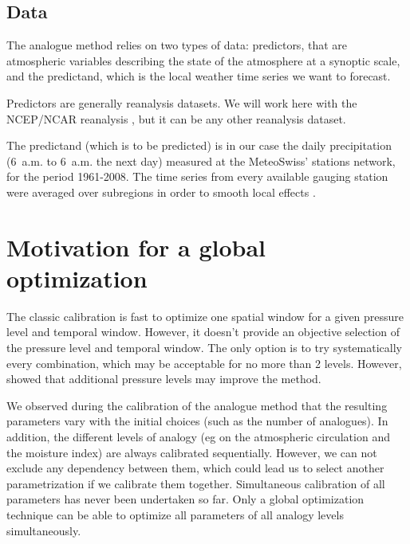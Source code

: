 \documentclass{ametsoc}
\begin{document}
\subsection{Data}
\label{section_data}

The analogue method relies on two types of data: predictors, that are atmospheric variables describing the state of the atmosphere at a synoptic scale, and the predictand, which is the local weather time series we want to forecast.

Predictors are generally reanalysis datasets. We will work here with the NCEP/NCAR reanalysis \citep[6-hourly, 17 pressure levels at a resolution of 2.5\degree, see][]{Kalnay1996}, but it can be any other reanalysis dataset.

The predictand (which is to be predicted) is in our case the daily precipitation (6~a.m. to 6~a.m. the next day) measured at the MeteoSwiss' stations network, for the period 1961-2008. The time series from every available gauging station were averaged over subregions in order to smooth local effects \citep{Obled2002, Marty2012}.



\section{Motivation for a global optimization}

The classic calibration is fast to optimize one spatial window for a given pressure level and temporal window. However, it doesn't provide an objective selection of the pressure level and temporal window. The only option is to try systematically every combination, which may be acceptable for no more than 2 levels. However, \citet{Horton2012a} showed that additional pressure levels may improve the method.

We observed during the calibration of the analogue method that the resulting parameters vary with the initial choices (such as the number of analogues). In addition, the different levels of analogy (eg on the atmospheric circulation and the moisture index) are always calibrated sequentially. However, we can not exclude any dependency between them, which could lead us to select another parametrization if we calibrate them together. Simultaneous calibration of all parameters has never been undertaken so far. Only a global optimization technique can be able to optimize all parameters of all analogy levels simultaneously.
\end{document}
